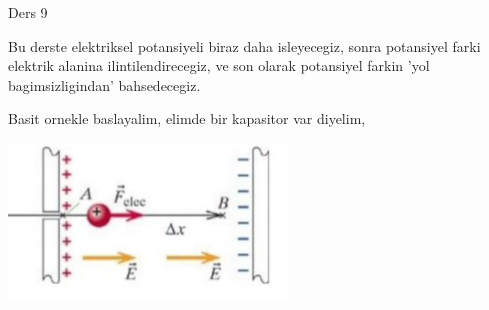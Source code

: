 \documentclass[12pt,fleqn]{article}\usepackage{../../common}
\begin{document}
Ders 9

Bu derste elektriksel potansiyeli biraz daha isleyecegiz, sonra potansiyel farki
elektrik alanina ilintilendirecegiz, ve son olarak potansiyel farkin 'yol
bagimsizligindan' bahsedecegiz.

Basit ornekle baslayalim, elimde bir kapasitor var diyelim,

\includegraphics[width=20em]{09_01.jpg}
\end{document}
